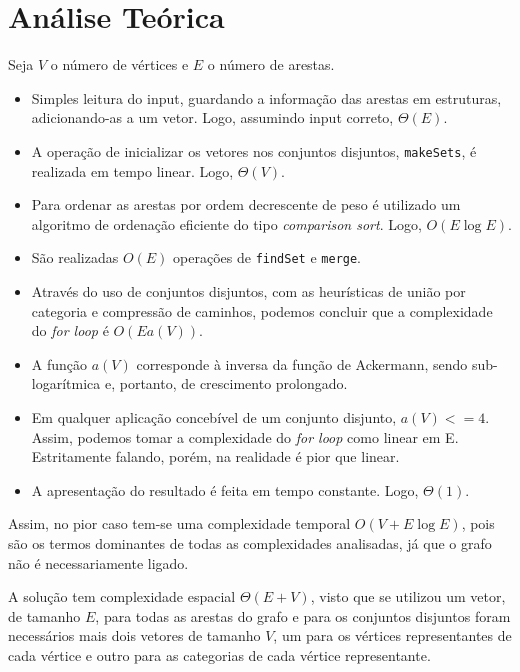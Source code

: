 \documentclass[12pt,a4paper]{article}
\begin{document}
  \section{Análise Teórica}

  Seja $V$ o número de vértices e $E$ o número de arestas.

  \begin{itemize}
    \setlength{\itemsep}{0pt}
    \item Simples leitura do input, guardando a informação das arestas em estruturas, adicionando-as a um vetor. Logo, assumindo input correto, $\Theta(E)$.
    \item A operação de inicializar os vetores nos conjuntos disjuntos, \texttt{makeSets}, é realizada em tempo linear. Logo, $\Theta(V)$.
    \item Para ordenar as arestas por ordem decrescente de peso é utilizado um algoritmo de ordenação eficiente do tipo \textit{comparison sort}. Logo, $O(E\log E)$.
    \item São realizadas $O(E)$ operações de \texttt{findSet} e \texttt{merge}.
    \item Através do uso de conjuntos disjuntos, com as heurísticas de união por categoria e compressão de caminhos, podemos concluir que a complexidade do \textit{for loop} é $O(E a(V))$.
    \item A função $a(V)$ corresponde à inversa da função de Ackermann\cite{enwiki:1123526697}, sendo sub-logarítmica e, portanto, de crescimento prolongado.
    \item Em qualquer aplicação concebível de um conjunto disjunto, $a(V) <= 4$\cite{enwiki:1123526697}. Assim, podemos tomar a complexidade do \textit{for loop} como linear em E. Estritamente falando, porém, na realidade é pior que linear.
    \item A apresentação do resultado é feita em tempo constante. Logo, $\Theta(1)$.
  \end{itemize}

  Assim, no pior caso tem-se uma complexidade temporal $O(V + E\log E)$, pois são os termos dominantes de todas as complexidades analisadas, já que o grafo não é necessariamente ligado.

  A solução tem complexidade espacial $\Theta(E + V)$, visto que se utilizou um vetor, de tamanho $E$, para todas as arestas do grafo e para os conjuntos disjuntos foram necessários mais dois vetores de tamanho $V$, um para os vértices representantes de cada vértice e outro para as categorias de cada vértice representante.
\end{document}
